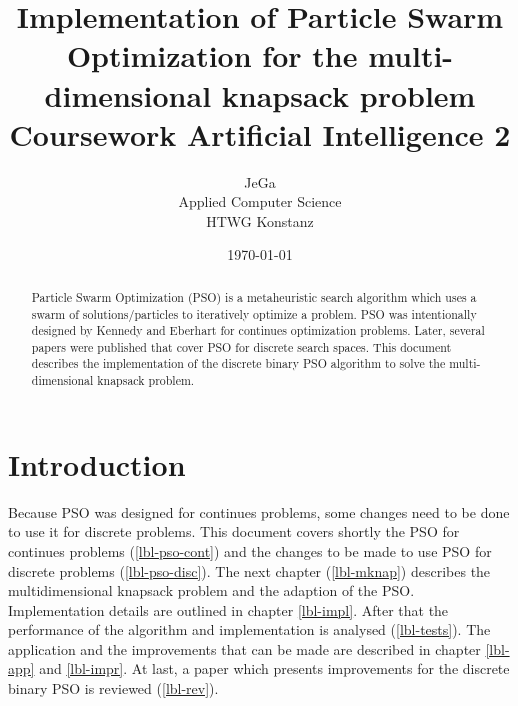 \documentclass{article}
\begin{document}
\title{Implementation of Particle Swarm Optimization for the multi-dimensional knapsack problem \\
\vspace{2 mm} {\large Coursework Artificial Intelligence 2}}
\author{JeGa\\
        Applied Computer Science\\
		HTWG Konstanz}
\date{\today}
\maketitle

\begin{abstract}
Particle Swarm Optimization (PSO) is a metaheuristic search algorithm which uses a swarm of solutions/particles to iteratively optimize a problem. PSO was intentionally designed by Kennedy and Eberhart \cite{bib-continues} for continues optimization problems. Later, several papers were published that cover PSO for discrete search spaces. This document describes the implementation of the discrete binary PSO algorithm to solve the multi-dimensional knapsack problem.
\end{abstract}

\newpage
\cfoot[\thepage]{}

\tableofcontents

\newpage

\section{Introduction}
\label{lbl-intro}
Because PSO was designed for continues problems, some changes need to be done to use it for discrete problems. This document covers shortly the PSO for continues problems (\ref{lbl-pso-cont}) and the changes to be made to use PSO for discrete problems (\ref{lbl-pso-disc}). The next chapter (\ref{lbl-mknap}) describes the multidimensional knapsack problem and the adaption of the PSO.
Implementation details are outlined in chapter \ref{lbl-impl}. After that the performance of the algorithm and implementation is analysed (\ref{lbl-tests}). The application and the improvements that can be made are described in chapter \ref{lbl-app} and \ref{lbl-impr}. At last, a paper which presents improvements for the discrete binary PSO is reviewed (\ref{lbl-rev}).
\end{document}
